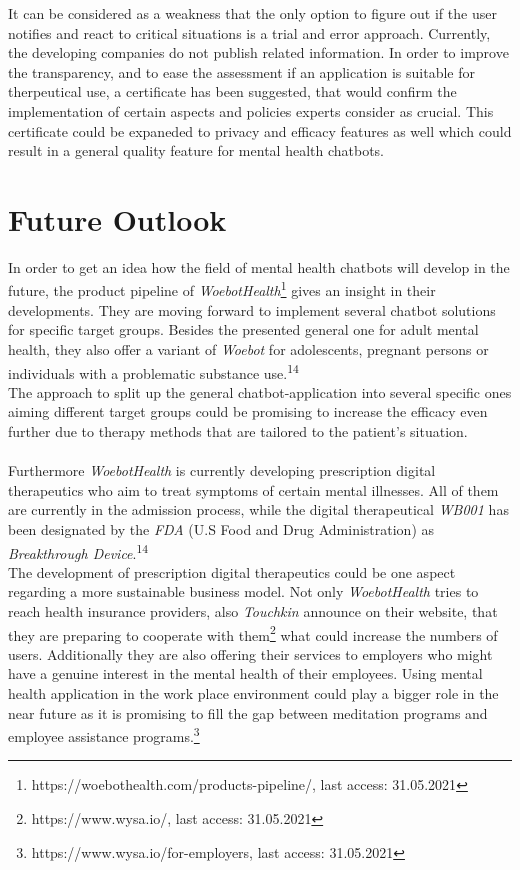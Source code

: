 \documentclass[sigconf, nonacm]{acmart}
\begin{document}
It can be considered as a weakness that the only option to figure out if the user notifies and react to critical situations is a trial and error approach. Currently, the developing companies do not publish related information. In order to improve the transparency, and to ease the assessment if an application is suitable for therpeutical use, a certificate has been suggested, that would confirm the implementation of certain aspects and policies experts consider as crucial.
This certificate could be expaneded to privacy and efficacy features as well which could result in a general quality feature for mental health chatbots.

\section{Future Outlook}
In order to get an idea how the field of mental health chatbots will develop in the future, the product pipeline of \emph{WoebotHealth}\footnote{https://woebothealth.com/products-pipeline/, last access: 31.05.2021} gives an insight in their developments. They are moving forward to implement several chatbot solutions for specific target groups. Besides the presented general one for adult mental health, they also offer a variant of \emph{Woebot} for adolescents, pregnant persons or 
individuals with a problematic substance use.\textsuperscript{14}
\\
The approach to split up the general chatbot-application into several specific ones aiming different target groups could be promising to increase the efficacy even further due to therapy methods that are tailored to the patient's situation. 
\\\\
Furthermore \emph{WoebotHealth} is currently developing prescription digital therapeutics who aim to treat symptoms of certain mental illnesses. All of them are currently in the admission process, while the digital therapeutical \emph{WB001} has been designated by the \emph{FDA} (U.S Food and Drug Administration) as \emph{Breakthrough Device}.\textsuperscript{14}
\\
The development of prescription digital therapeutics could be one aspect regarding a more sustainable business model. Not only \emph{WoebotHealth} tries to reach health insurance providers, also \emph{Touchkin} announce on their website, that they are preparing to cooperate with them\footnote{https://www.wysa.io/, last access: 31.05.2021} what could increase the numbers of users.
Additionally they are also offering their services to employers who might have a genuine interest in the mental health of their employees. Using mental health application in the work place environment could play a bigger role in the near future as it is promising to fill the gap between meditation programs and employee assistance programs.\footnote{https://www.wysa.io/for-employers, last access: 31.05.2021}
\end{document}
